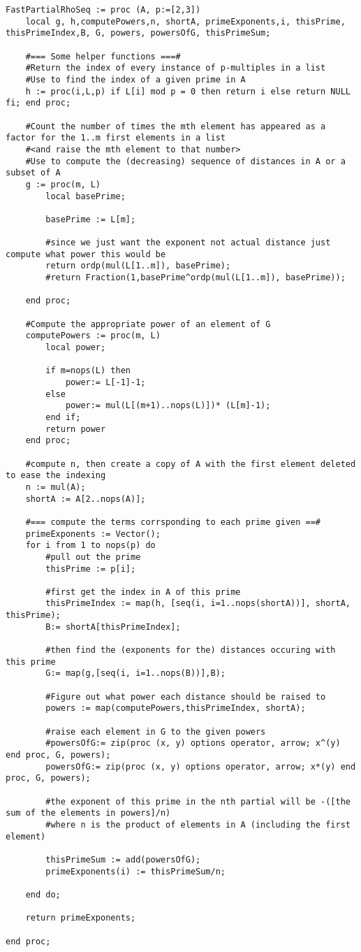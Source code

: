 \newpage
\begin{lstlisting}
FastPartialRhoSeq := proc (A, p:=[2,3]) 
	local g, h,computePowers,n, shortA, primeExponents,i, thisPrime, thisPrimeIndex,B, G, powers, powersOfG, thisPrimeSum;
	
	#=== Some helper functions ===#
	#Return the index of every instance of p-multiples in a list 
	#Use to find the index of a given prime in A
	h := proc(i,L,p) if L[i] mod p = 0 then return i else return NULL fi; end proc;	

	#Count the number of times the mth element has appeared as a factor for the 1..m first elements in a list
	#<and raise the mth element to that number>
	#Use to compute the (decreasing) sequence of distances in A or a subset of A
	g := proc(m, L)
		local basePrime;
		
		basePrime := L[m];
		
		#since we just want the exponent not actual distance just compute what power this would be
		return ordp(mul(L[1..m]), basePrime); 
		#return Fraction(1,basePrime^ordp(mul(L[1..m]), basePrime));

	end proc;
	
	#Compute the appropriate power of an element of G
	computePowers := proc(m, L)
		local power;
	
		if m=nops(L) then
			power:= L[-1]-1;
		else 
			power:= mul(L[(m+1)..nops(L)])* (L[m]-1);
		end if;
		return power
	end proc;
	
	#compute n, then create a copy of A with the first element deleted to ease the indexing
	n := mul(A);
	shortA := A[2..nops(A)];

	#=== compute the terms corrsponding to each prime given ==#
	primeExponents := Vector();
	for i from 1 to nops(p) do
		#pull out the prime 
		thisPrime := p[i];

		#first get the index in A of this prime
		thisPrimeIndex := map(h, [seq(i, i=1..nops(shortA))], shortA, thisPrime);
		B:= shortA[thisPrimeIndex];

		#then find the (exponents for the) distances occuring with this prime
		G:= map(g,[seq(i, i=1..nops(B))],B);
	
		#Figure out what power each distance should be raised to
		powers := map(computePowers,thisPrimeIndex, shortA);
	
		#raise each element in G to the given powers
   		#powersOfG:= zip(proc (x, y) options operator, arrow; x^(y) end proc, G, powers); 
		powersOfG:= zip(proc (x, y) options operator, arrow; x*(y) end proc, G, powers); 
		
		#the exponent of this prime in the nth partial will be -([the sum of the elements in powers]/n)
		#where n is the product of elements in A (including the first element)

		thisPrimeSum := add(powersOfG);
		primeExponents(i) := thisPrimeSum/n; 
		
 	end do;

	return primeExponents;
	
end proc;
\end{lstlisting}

